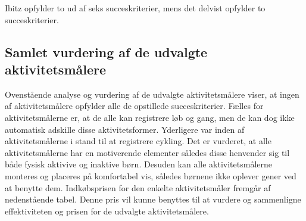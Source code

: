Ibitz opfylder to ud af seks succeskriterier, mens det delvist opfylder to succeskriterier.

\subsection{Samlet vurdering af de udvalgte aktivitetsmålere}
Ovenstående analyse og vurdering af de udvalgte aktivitetsmålere viser, at ingen af aktivitetsmålere opfylder alle de opstillede succeskriterier. \newline
Fælles for aktivitetsmålerne er, at de alle kan registrere løb og gang, men de kan dog ikke automatisk adskille disse aktivitetsformer. Yderligere var inden af aktivitetsmålerne i stand til at registrere cykling. \newline
Det er vurderet, at alle aktivitetsmålerne har en motiverende elementer således disse henvender sig til både fysisk aktivive og inaktive børn. \newline
Desuden kan alle aktivitetsmålerne monteres og placeres på komfortabel vis, således børnene ikke oplever gener ved at benytte dem. \newline
Indkøbsprisen for den enkelte aktivitetsmåler fremgår af nedenstående tabel. Denne pris vil kunne benyttes til at vurdere og sammenligne effektiviteten og prisen for de udvalgte aktivitetsmålere.  


